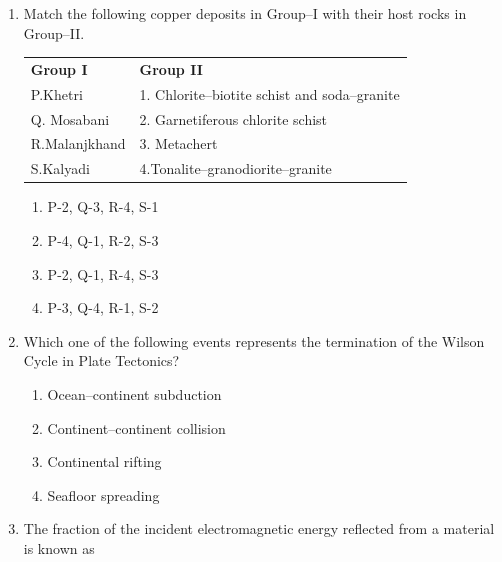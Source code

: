 \documentclass[journal,12pt,onecolumn]{IEEEtran}
\begin{document}
\begin{enumerate}
\hfill{}

\begin{multicols}{4}
\begin{enumerate}
\item I
\item II
\item III
\item IV
\end{enumerate}
\end{multicols}

\item Match the following copper deposits in Group--I with their host rocks in Group--II.  

\begin{tabular}{p{} p{}}
\textbf{Group I} & \textbf{Group II} \\
P.Khetri & 1. Chlorite–biotite schist and soda–granite \\
Q. Mosabani  & 2. Garnetiferous chlorite schist\\
 
R.Malanjkhand & 3. Metachert  \\
S.Kalyadi& 4.Tonalite–granodiorite–granite  \\
\end{tabular}  
\hfill{}

\begin{enumerate}
\item P-2, Q-3, R-4, S-1
\item P-4, Q-1, R-2, S-3
\item P-2, Q-1, R-4, S-3
\item P-3, Q-4, R-1, S-2
\end{enumerate}


\item Which one of the following events represents the termination of the Wilson Cycle in Plate Tectonics?  

\hfill{}


\begin{enumerate}
\item Ocean--continent subduction
\item Continent--continent collision
\item Continental rifting
\item Seafloor spreading
\end{enumerate}

\item The fraction of the incident electromagnetic energy reflected from a material is known as  


\end{enumerate}
\end{document}
